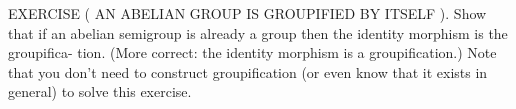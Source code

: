 EXERCISE ( AN ABELIAN GROUP IS GROUPIFIED BY ITSELF ). Show that if an abelian semigroup is already a group then the identity morphism is the groupifica- tion. (More correct: the identity morphism is a groupification.) Note that you don’t need to construct groupification (or even know that it exists in general) to solve this exercise.

